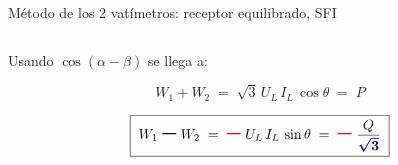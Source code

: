 \documentclass[aspectratio=169, usenames,svgnames,dvipsnames]{beamer}
\begin{document}
\begin{frame}{Método de los 2 vatímetros: \hspace{3mm}receptor equilibrado, \hspace{3mm}SFI}
\begin{columns}
\begin{column}{0.5\columnwidth}
        \hspace{3mm}Usando \href{https://raw.githubusercontent.com/ETSIDI-IE/tc/master/docs/diapos/TC1_Trigonometria_Complejos_LBB.pdf}{$\cos(\alpha-\beta)$} se llega a:
        
    	\[
            \boxed{\; W_1 + W_2
            \;=\; \sqrt3 \, U_L \, I_L \, \cos \theta 
            \;=\; P \;}
        \]

        \vspace{-4mm}
        \[
            \boxed{\; W_1 \, {\Large\boldsymbol{\color{blue!50!black} -}} \, W_2
            \;=\, {\Large\boldsymbol{\color{red} -}} \, U_L \, I_L \, \sin \theta 
            \;=\, {\Large\boldsymbol{\color{red} -}} \, \frac{Q}{\boldsymbol{\color{blue!50!black} \sqrt{3}}} \;}
        \]        
    \end{column}
    \end{columns}
\end{frame}

\end{document}
